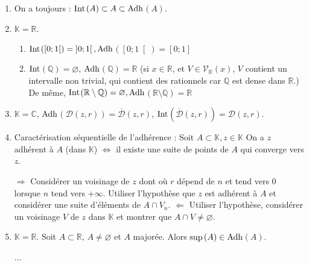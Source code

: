 \documentclass[12pt,a4paper]{report}
\begin{document}
\begin{remarque}
\begin{enumerate}
\item On a toujours : $\rm{Int}$$(A) \subset A  \subset \rm{Adh}$$(A)$.
\item $\mathbb{K}=\mathbb{R}$.
\begin{enumerate}
\item $\rm{Int}$$(\left[0;1\right[) = \left]0;1\right[, \rm{Adh}$$(\left[0;1\right[) = \left[0;1\right]$
\item $\rm{Int}$$(\mathbb{Q}) = \varnothing$, $\rm{Adh}$$(\mathbb{Q}) = \mathbb{R}$ (si $x \in \mathbb{R}$, et $V \in \mathcal{V}_\mathbb{R}(x)$, $V$ contient un intervalle non trivial, qui contient des rationnels car $\mathbb{Q}$ est dense dans $\mathbb{R}$.)
\newline De même, $\rm{Int}$$(\mathbb{R} \setminus \mathbb{Q}) = \varnothing, \rm{Adh}$$(\mathbb{R} \setminus \mathbb{Q}) = \mathbb{R}$
\end{enumerate}
\item $\mathbb{K} = \mathbb{C}$, $\rm{Adh}$$(\mathcal{D}(z,r)) = \overline{\mathcal{D}}(z,r)$, $\rm{Int}$$(\overline{\mathcal{D}}(z,r)) = \mathcal{D}(z,r)$.
\item Caractérisation séquentielle de l'adhérence :
\newline Soit $A \subset \mathbb{K}, z \in \mathbb{K}$ On a $z$ adhérent à $A$ (dans $\mathbb{K}$) $\Longleftrightarrow$ il existe une suite de points de $A$ qui converge vers $z$.

\begin{principedemo}{}
$\Longrightarrow$ Considérer un voisinage de $z$ dont où $r$ dépend de $n$ et tend vers $0$ lorsque $n$ tend vers $+\infty$. Utiliser l'hypothèse que $z$ est adhérent à $A$ et considérer une suite d'éléments de $A \cap V_n$.
\newline $\Longleftarrow$ Utiliser l'hypothèse, considérer un voisinage $V$ de $z$ dans $\mathbb{K}$ et montrer que $A \cap V \neq \varnothing$.
\end{principedemo}


\item $\mathbb{K}=\mathbb{R}$. Soit $A \subset \mathbb{R}$, $A \neq \varnothing$ et $A$ majorée. Alors $\rm{sup}$$(A) \in \rm{Adh}$$(A)$.
\begin{principedemo}{}
...
\end{principedemo}
\end{enumerate}
\end{remarque}
\end{document}
